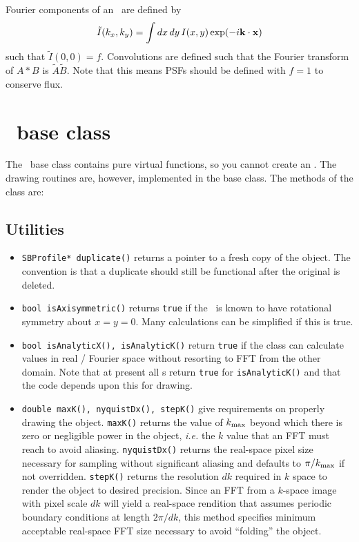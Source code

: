 \documentclass[11pt,preprint,flushrt]{aastex}
\begin{document}
Fourier components of an \sbp\ are defined by
\begin{equation}
\tilde I(k_x, k_y) = \int dx\,dy\, I(x,y) \exp(-i{\bf k}\cdot{\bf x})
\end{equation}
such that $\tilde I(0,0) = f$.  Convolutions are defined such that the Fourier transform of $A\ast B$ is $\tilde A \tilde B$.   Note that this means PSFs should be defined with $f=1$ to conserve flux.

\section{\sbp\ base class}
The \sbp\ base class contains pure virtual functions, so you cannot create an \sbp.  The drawing routines are, however, implemented in the base class.  The methods of the class are:
\subsection{Utilities}
\begin{itemize}
\item {\tt SBProfile* duplicate()} returns a pointer to a fresh copy of the object.  The convention is that a duplicate should still be functional after the original is deleted.
\item {\tt bool isAxisymmetric()} returns {\tt true} if the \sbp\ is known to have rotational symmetry about $x=y=0$.  Many calculations can be simplified if this is true.
\item {\tt  bool isAnalyticX(), isAnalyticK()} return {\tt true} if the class can calculate values in real / Fourier space without resorting to FFT from the other domain.  Note that at present all {\sbp}s return {\tt true} for {\tt isAnalyticK()} and that the code depends upon this for drawing.  
\item {\tt double maxK(), nyquistDx(), stepK()} give requirements on properly drawing the object.  {\tt maxK()} returns the value of $k_{\rm max}$ beyond which there is zero or negligible power in the object, {\it i.e.} the $k$ value that an FFT must reach to avoid aliasing.  {\tt nyquistDx()} returns the real-space pixel size necessary for sampling without significant aliasing and defaults to $\pi/k_{\rm max}$ if not overridden.  {\tt stepK()} returns the resolution $dk$ required in $k$ space to render the object to desired precision.  Since an FFT from a $k$-space image with pixel scale $dk$ will yield a real-space rendition that assumes periodic boundary conditions at length $2\pi/dk$, this method specifies minimum acceptable real-space FFT size necessary to avoid ``folding'' the object.
\end{itemize}
\end{document}
